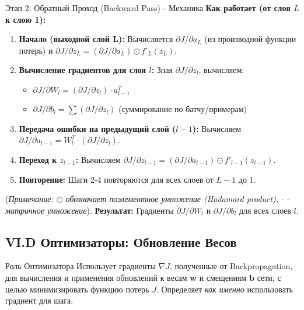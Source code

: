 \begin{myexampleblock}{Этап 2: Обратный Проход (Backward Pass) - Механика}
    \textbf{Как работает (от слоя $L$ к слою 1):}
    \begin{enumerate}[nosep, itemsep=0.5ex]
        \item \textbf{Начало (выходной слой L):} Вычисляется $\partial J / \partial a_L$ (из производной функции потерь) и $\partial J / \partial z_L = (\partial J / \partial a_L) \odot f'_L(z_L)$.
        \item \textbf{Вычисление градиентов для слоя $l$:} Зная $\partial J / \partial z_l$, вычисляем:
            \begin{itemize}[label=\textbullet, nosep, leftmargin=*]
                \item $\partial J / \partial W_l = (\partial J / \partial z_l) \cdot a_{l-1}^T$
                \item $\partial J / \partial b_l = \sum (\partial J / \partial z_l)$ (суммирование по батчу/примерам)
            \end{itemize}
        \item \textbf{Передача ошибки на предыдущий слой ($l-1$):} Вычисляем $\partial J / \partial a_{l-1} = W_l^T \cdot (\partial J / \partial z_l)$.
        \item \textbf{Переход к $z_{l-1}$:} Вычисляем $\partial J / \partial z_{l-1} = (\partial J / \partial a_{l-1}) \odot f'_{l-1}(z_{l-1})$.
        \item \textbf{Повторение:} Шаги 2-4 повторяются для всех слоев от $L-1$ до 1.
    \end{enumerate}
     (\textit{Примечание: $\odot$ обозначает поэлементное умножение (Hadamard product), $\cdot$ - матричное умножение}).
     \textbf{Результат:} Градиенты $\partial J / \partial W_l$ и $\partial J / \partial b_l$ для всех слоев $l$.
\end{myexampleblock}

\subsection{VI.D Оптимизаторы: Обновление Весов}

\begin{alerttextbox}{Роль Оптимизатора}
    Использует градиенты $\nabla J$, полученные от Backpropagation, для вычисления и применения обновлений к весам $\mathbf{w}$ и смещениям $\mathbf{b}$ сети, с целью минимизировать функцию потерь $J$. Определяет \textit{как именно} использовать градиент для шага.
\end{alerttextbox}

